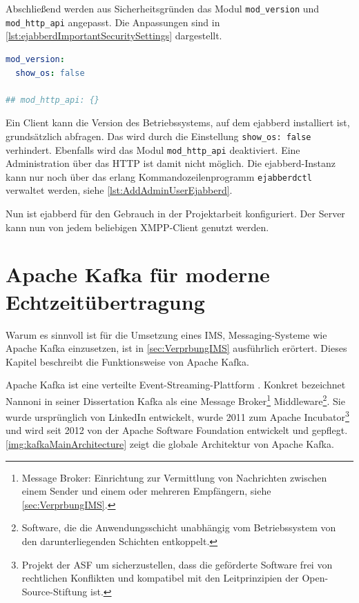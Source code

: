 \documentclass[a4paper,titlepage,halfparskip,12pt]{scrreprt}
\begin{document}
\begin{onehalfspacing}
Abschließend werden aus Sicherheitsgründen das Modul \texttt{mod\_version} und \texttt{mod\_http\_api} angepasst. Die Anpassungen sind in \autoref{lst:ejabberdImportantSecuritySettings} dargestellt.

\begin{lstlisting}[language=yaml, caption={Konfiguration relevanter Module für die Sicherheit von ejabberd},label={lst:ejabberdImportantSecuritySettings}]
mod_version: 
  show_os: false

## mod_http_api: {}
\end{lstlisting}

Ein Client kann die Version des Betriebssystems, auf dem ejabberd installiert ist, grundsätzlich abfragen. Das wird durch die Einstellung \texttt{show\_os: false} verhindert. Ebenfalls wird das Modul \texttt{mod\_http\_api} deaktiviert. Eine Administration über das \ac{HTTP} ist damit nicht möglich. Die ejabberd-Instanz kann nur noch über das erlang Kommandozeilenprogramm \texttt{ejabberdctl} verwaltet werden, siehe \autoref{lst:AddAdminUserEjabberd}.

Nun ist ejabberd für den Gebrauch in der Projektarbeit konfiguriert. Der Server kann nun von jedem beliebigen \ac{XMPP}-Client genutzt werden.

\pagebreak

\section{Apache Kafka für moderne Echtzeitübertragung}
\label{sec:KafkaDescription}

Warum es sinnvoll ist für die Umsetzung eines \acs{IMS}, Messaging-Systeme wie Apache Kafka einzusetzen, ist in \autoref{sec:VerprbungIMS} ausführlich erörtert. Dieses Kapitel beschreibt die Funktionsweise von Apache Kafka. 

Apache Kafka ist eine verteilte Event-Streaming-Plattform \cite{kafkaConfluent}. Konkret bezeichnet Nannoni in seiner Dissertation \cite{nannoniDissKafka} Kafka als eine Message Broker\footnote{Message Broker: Einrichtung zur Vermittlung von Nachrichten zwischen einem Sender und einem oder mehreren Empfängern, siehe \autoref{sec:VerprbungIMS}.} Middleware\footnote{Software, die die Anwendungsschicht unabhängig vom Betriebssystem von den darunterliegenden Schichten entkoppelt.}. Sie wurde ursprünglich von LinkedIn entwickelt, wurde 2011 zum Apache Incubator\footnote{Projekt der \ac{ASF} um sicherzustellen, dass die geförderte Software frei von rechtlichen Konflikten und kompatibel mit den Leitprinzipien der Open-Source-Stiftung ist.\cite{asfIncubator}} und wird seit 2012 von der Apache Software Foundation entwickelt und gepflegt\cite{kafkaConfluent}. \autoref{img:kafkaMainArchitecture} zeigt die globale Architektur von Apache Kafka.


\end{onehalfspacing}
\end{document}
